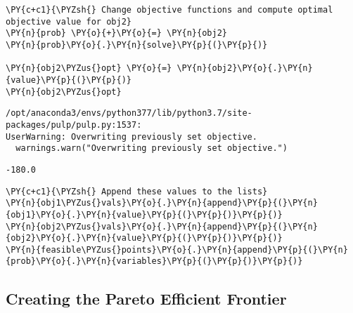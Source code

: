     \begin{tcolorbox}[breakable, size=fbox, boxrule=1pt, pad at break*=1mm,colback=cellbackground, colframe=cellborder]
\begin{Verbatim}[commandchars=\\\{\}]
\PY{c+c1}{\PYZsh{} Change objective functions and compute optimal objective value for obj2}
\PY{n}{prob} \PY{o}{+}\PY{o}{=} \PY{n}{obj2}
\PY{n}{prob}\PY{o}{.}\PY{n}{solve}\PY{p}{(}\PY{p}{)}

\PY{n}{obj2\PYZus{}opt} \PY{o}{=} \PY{n}{obj2}\PY{o}{.}\PY{n}{value}\PY{p}{(}\PY{p}{)}
\PY{n}{obj2\PYZus{}opt}
\end{Verbatim}
\end{tcolorbox}

    \begin{Verbatim}[commandchars=\\\{\}]
/opt/anaconda3/envs/python377/lib/python3.7/site-packages/pulp/pulp.py:1537:
UserWarning: Overwriting previously set objective.
  warnings.warn("Overwriting previously set objective.")
    \end{Verbatim}

            \begin{tcolorbox}[breakable, size=fbox, boxrule=.5pt, pad at break*=1mm, opacityfill=0]
\begin{Verbatim}[commandchars=\\\{\}]
-180.0
\end{Verbatim}
\end{tcolorbox}
        
    \begin{tcolorbox}[breakable, size=fbox, boxrule=1pt, pad at break*=1mm,colback=cellbackground, colframe=cellborder]
\begin{Verbatim}[commandchars=\\\{\}]
\PY{c+c1}{\PYZsh{} Append these values to the lists}
\PY{n}{obj1\PYZus{}vals}\PY{o}{.}\PY{n}{append}\PY{p}{(}\PY{n}{obj1}\PY{o}{.}\PY{n}{value}\PY{p}{(}\PY{p}{)}\PY{p}{)}
\PY{n}{obj2\PYZus{}vals}\PY{o}{.}\PY{n}{append}\PY{p}{(}\PY{n}{obj2}\PY{o}{.}\PY{n}{value}\PY{p}{(}\PY{p}{)}\PY{p}{)}
\PY{n}{feasible\PYZus{}points}\PY{o}{.}\PY{n}{append}\PY{p}{(}\PY{n}{prob}\PY{o}{.}\PY{n}{variables}\PY{p}{(}\PY{p}{)}\PY{p}{)}
\end{Verbatim}
\end{tcolorbox}

    \hypertarget{creating-the-pareto-efficient-frontier}{%
\subsection{Creating the Pareto Efficient
Frontier}\label{creating-the-pareto-efficient-frontier}}


